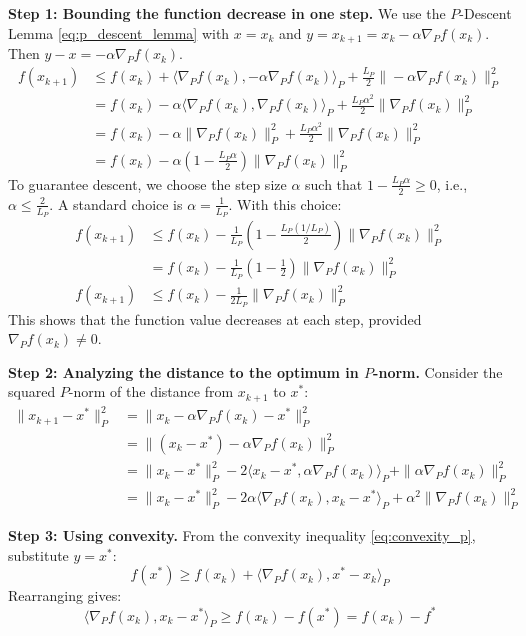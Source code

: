 \documentclass{article}
\newcommand{\normp}[1]{\|#1\|_P}       %
\newcommand{\gradp}{\nabla_P}
\newcommand{\ipp}[2]{\langle #1, #2 \rangle_P} %
\begin{document}
\textbf{Step 1: Bounding the function decrease in one step.}
We use the $P$-Descent Lemma \eqref{eq:p_descent_lemma} with $x = x_k$ and $y = x_{k+1} = x_k - \alpha \gradp f(x_k)$. Then $y - x = -\alpha \gradp f(x_k)$.
\begin{align*}
    f(x_{k+1}) &\le f(x_k) + \ipp{\gradp f(x_k)}{-\alpha \gradp f(x_k)} + \frac{L_P}{2} \normp{-\alpha \gradp f(x_k)}^2 \\
    &= f(x_k) - \alpha \ipp{\gradp f(x_k)}{\gradp f(x_k)} + \frac{L_P \alpha^2}{2} \normp{\gradp f(x_k)}^2 \\
    &= f(x_k) - \alpha \normp{\gradp f(x_k)}^2 + \frac{L_P \alpha^2}{2} \normp{\gradp f(x_k)}^2 \\
    &= f(x_k) - \alpha \left( 1 - \frac{L_P \alpha}{2} \right) \normp{\gradp f(x_k)}^2
\end{align*}
To guarantee descent, we choose the step size $\alpha$ such that $1 - \frac{L_P \alpha}{2} \ge 0$, i.e., $\alpha \le \frac{2}{L_P}$. A standard choice is $\alpha = \frac{1}{L_P}$. With this choice:
\begin{align}
    f(x_{k+1}) &\le f(x_k) - \frac{1}{L_P} \left( 1 - \frac{L_P (1/L_P)}{2} \right) \normp{\gradp f(x_k)}^2 \nonumber \\
    &= f(x_k) - \frac{1}{L_P} \left( 1 - \frac{1}{2} \right) \normp{\gradp f(x_k)}^2 \nonumber \\
    f(x_{k+1}) &\le f(x_k) - \frac{1}{2 L_P} \normp{\gradp f(x_k)}^2 \label{eq:func_decrease_p}
\end{align}
This shows that the function value decreases at each step, provided $\gradp f(x_k) \neq 0$.

\textbf{Step 2: Analyzing the distance to the optimum in $P$-norm.}
Consider the squared $P$-norm of the distance from $x_{k+1}$ to $x^*$:
\begin{align*}
    \normp{x_{k+1} - x^*}^2 &= \normp{x_k - \alpha \gradp f(x_k) - x^*}^2 \\
    &= \normp{(x_k - x^*) - \alpha \gradp f(x_k)}^2 \\
    &= \normp{x_k - x^*}^2 - 2 \ipp{x_k - x^*}{\alpha \gradp f(x_k)} + \normp{\alpha \gradp f(x_k)}^2 \\
    &= \normp{x_k - x^*}^2 - 2 \alpha \ipp{\gradp f(x_k)}{x_k - x^*} + \alpha^2 \normp{\gradp f(x_k)}^2
\end{align*}

\textbf{Step 3: Using convexity.}
From the convexity inequality \eqref{eq:convexity_p}, substitute $y = x^*$:
\begin{equation*}
    f(x^*) \ge f(x_k) + \ipp{\gradp f(x_k)}{x^* - x_k}
\end{equation*}
Rearranging gives:
\begin{equation} \label{eq:convex_for_dist_p}
    \ipp{\gradp f(x_k)}{x_k - x^*} \ge f(x_k) - f(x^*) = f(x_k) - f^*
\end{equation}
\end{document}
